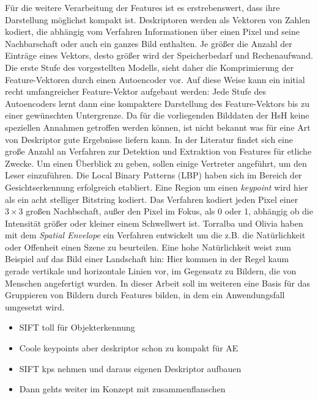 Für die weitere Verarbeitung der Features ist es erstrebenswert, dass ihre Darstellung möglichst kompakt ist. Deskriptoren werden als Vektoren von Zahlen kodiert, die abhängig vom Verfahren Informationen über einen Pixel und seine Nachbarschaft oder auch ein ganzes Bild enthalten. Je größer die Anzahl der Einträge eines Vektors, desto größer wird der Speicherbedarf und Rechenaufwand.
Die erste Stufe des vorgestellten Modells, sieht daher die Komprimierung der Feature-Vektoren durch einen Autoencoder vor. Auf diese Weise kann ein initial recht umfangreicher Feature-Vektor aufgebaut werden: Jede Stufe des Autoencoders lernt dann eine kompaktere Darstellung des Feature-Vektors bis zu einer gewünschten Untergrenze.\newline
Da für die vorliegenden Bilddaten der HsH keine speziellen Annahmen getroffen werden können, ist nicht bekannt was für eine Art von Deskriptor gute Ergebnisse liefern kann. In der Literatur findet sich eine große Anzahl an Verfahren zur Detektion und Extraktion von Features für etliche Zwecke. Um einen Überblick zu geben, sollen einige Vertreter angeführt, um den Leser einzuführen.
\newline 
Die Local Binary Patterns (LBP) haben sich im Bereich der Gesichtserkennung erfolgreich etabliert. Eine Region um einen \textit{keypoint} wird hier als ein acht stelliger Bitstring kodiert. Das Verfahren kodiert jeden Pixel einer $3 \times 3$ großen Nachbschaft, außer den Pixel im Fokus, als 0 oder 1, abhängig ob die Intensität größer oder kleiner einem Schwellwert ist.\newline 
Torralba und Olivia \cite{mts2001} haben mit dem  \textit{Spatial Envelope} ein Verfahren entwickelt um die z.B. die Natürlichkeit oder Offenheit einen Szene zu beurteilen. Eine hohe Natürlichkeit weist zum Beispiel auf das Bild einer Landschaft hin: Hier kommen in der Regel kaum gerade vertikale und horizontale Linien vor, im Gegensatz zu Bildern, die von Menschen angefertigt wurden. In dieser Arbeit soll im weiteren eine Basis für das Gruppieren von Bildern durch Features bilden, in dem ein Anwendungsfall umgesetzt wird.

\begin{itemize}
	\item SIFT toll für Objekterkennung
	\item Coole keypoints aber deskriptor schon zu kompakt für AE
	\item SIFT kps nehmen und daraus eigenen Deskriptor aufbauen
	\item Dann gehts weiter im Konzept mit zusammenflanschen
\end{itemize}